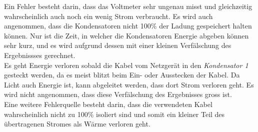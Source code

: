 \documentclass[a4paper,12pt]{article}
\begin{document}
Ein Fehler besteht darin, dass das Voltmeter sehr ungenau misst und gleichzeitig wahrscheinlich auch noch ein wenig Strom verbraucht. Es wird auch angenommen, dass die Kondensatoren nicht 100\% der Ladung gespeichert halten können. Nur ist die Zeit, in welcher die Kondensatoren Energie abgeben können sehr kurz, und es wird aufgrund dessen mit einer kleinen Verfälschung des Ergebnissses gerechnet.\\

Es geht Energie verloren sobald die Kabel vom Netzgerät in den \textit{Kondensator 1} gesteckt werden, da es meist blitzt beim Ein- oder Ausstecken der Kabel. Da Licht auch Energie ist, kann abgeleitet werden, dass dort Strom verloren geht. Es wird nicht angenommen, dass diese Verfälschung des Ergebnisses gross ist.\\

Eine weitere Fehlerquelle besteht darin, dass die verwendeten Kabel wahrscheinlich nicht zu 100\% isoliert sind und somit ein kleiner Teil des übertragenen Stromes als Wärme verloren geht.




\end{document}
